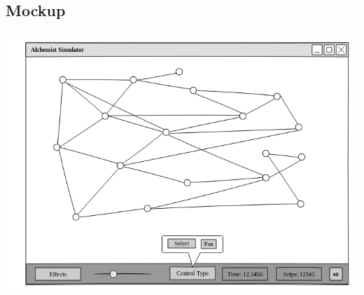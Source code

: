 \documentclass[%
]{beamer}
\begin{document}
        \subsection{Mockup}\label{subsec:mockup}
            \begin{frame}
                \frametitle{\insertsection}
                \framesubtitle{\insertsubsection}
                \centering
                \includegraphics[scale=0.415]{mock/withNodes/window}
            \end{frame}
\end{document}
